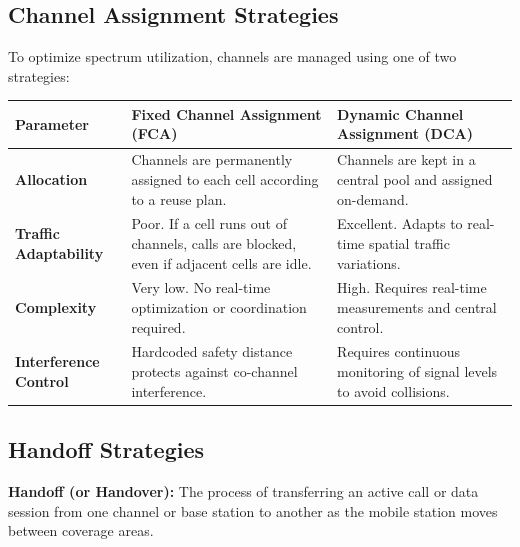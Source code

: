 \documentclass[12pt,a4paper]{article}
\renewcommand{\arraystretch}{1.45}
\begin{document}
\subsection{Channel Assignment Strategies}
To optimize spectrum utilization, channels are managed using one of two strategies:
\par\noindent
{\renewcommand{\arraystretch}{1.55}%
\begin{tabularx}{\linewidth}{|B{3.2cm}|Y|Y|}\hline
\textbf{Parameter} & \textbf{Fixed Channel Assignment (FCA)} & \textbf{Dynamic Channel Assignment (DCA)} \\[4pt]
\hline
\textbf{Allocation} & Channels are permanently assigned to each cell according to a reuse plan. & Channels are kept in a central pool and assigned on-demand. \\[4pt]
\hline
\textbf{Traffic Adaptability} & Poor. If a cell runs out of channels, calls are blocked, even if adjacent cells are idle. & Excellent. Adapts to real-time spatial traffic variations. \\[4pt]
\hline
\textbf{Complexity} & Very low. No real-time optimization or coordination required. & High. Requires real-time measurements and central control. \\[4pt]
\hline
\textbf{Interference Control} & Hardcoded safety distance protects against co-channel interference. & Requires continuous monitoring of signal levels to avoid collisions. \\[4pt]
\hline
\end{tabularx}
}

\subsection{Handoff Strategies}
\begin{tcolorbox}[defbox]
\textbf{Handoff (or Handover):} The process of transferring an active call or data session from one channel or base station to another as the mobile station moves between coverage areas.
\end{tcolorbox}
\end{document}
